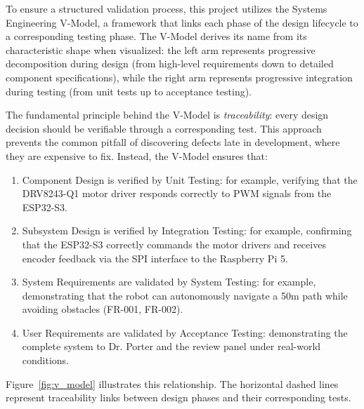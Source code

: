 To ensure a structured validation process, this project utilizes the Systems Engineering V-Model, a framework that links each phase of the design lifecycle to a corresponding testing phase. The V-Model derives its name from its characteristic shape when visualized: the left arm represents progressive decomposition during design (from high-level requirements down to detailed component specifications), while the right arm represents progressive integration during testing (from unit tests up to acceptance testing).

The fundamental principle behind the V-Model is \textit{traceability}: every design decision should be verifiable through a corresponding test. This approach prevents the common pitfall of discovering defects late in development, where they are expensive to fix. Instead, the V-Model ensures that:

\begin{enumerate}
    \item Component Design is verified by Unit Testing: for example, verifying that the DRV8243-Q1 motor driver responds correctly to PWM signals from the ESP32-S3.
    \item Subsystem Design is verified by Integration Testing: for example, confirming that the ESP32-S3 correctly commands the motor drivers and receives encoder feedback via the SPI interface to the Raspberry Pi 5.
    \item System Requirements are validated by System Testing: for example, demonstrating that the robot can autonomously navigate a 50m path while avoiding obstacles (FR-001, FR-002).
    \item User Requirements are validated by Acceptance Testing: demonstrating the complete system to Dr. Porter and the review panel under real-world conditions.
\end{enumerate}

Figure~\ref{fig:v_model} illustrates this relationship. The horizontal dashed lines represent traceability links between design phases and their corresponding tests.

